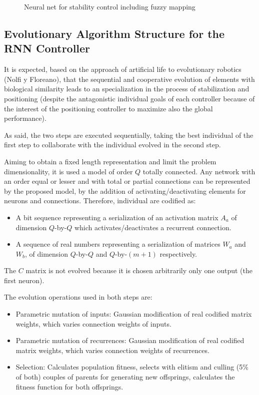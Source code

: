 \documentclass{sig-alternate}
\begin{document}
\begin{figure}[t]
  \label{fig:rnn-arch}
  \centering
  \caption{Neural net for stability control including fuzzy mapping}
  \label{rnn}
\end{figure}

\subsection*{Evolutionary Algorithm Structure for the RNN Controller}
It is expected, based on the approach of artificial life to
evolutionary robotics (Nolfi y Floreano), that the sequential and
cooperative evolution of elements with biological similarity leads to
an specialization in the process of stabilization and positioning
(despite the antagonistic individual goals of each controller because
of the interest of the positioning controller to maximize also the
global performance).

As said, the two steps are executed sequentially, taking the best
individual of the first step to collaborate with the individual
evolved in the second step.

Aiming to obtain a fixed length representation and limit the problem
dimensionality, it is used a model of order $Q$ totally connected. Any
network with an order equal or lesser and with total or partial
connections can be represented by the proposed model, by the addition
of activating/deactivating elements for neurons and
connections. Therefore, individual are codified as:

\begin{itemize}
\item A bit sequence representing a serialization of an activation
  matrix $A_a$ of dimension $Q$-by-$Q$ which activates/deactivates a
  recurrent connection.
\item A sequence of real numbers representing a serialization of
  matrices $W_a$ and $W_b$, of dimension $Q$-by-$Q$ and $Q$-by-$(m+1)$
  respectively.
\end{itemize}

The $C$ matrix is not evolved because it is chosen arbitrarily only
one output (the first neuron).

The evolution operations used in both steps are:
\begin{itemize}
\item Parametric mutation of inputs: Gaussian modification of real
  codified matrix weights, which varies connection weights of inputs.
\item Parametric mutation of recurrences: Gaussian modification of
  real codified matrix weights, which varies connection weights of
  recurrences.
\item Selection: Calculates population fitness, selects with elitism
  and culling (5\% of both) couples of parents for generating new
  offsprings, calculates the fitness function for both offsprings.
\end{itemize}
\end{document}
